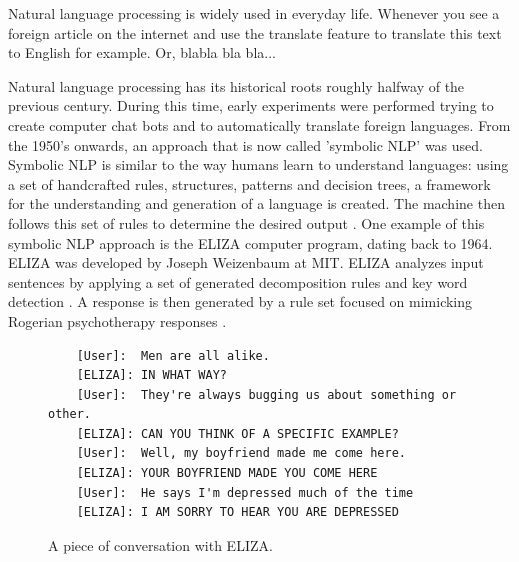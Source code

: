 \documentclass[twoside]{uva-inf-bachelor-thesis}
\begin{document}
Natural language processing is widely used in everyday life. Whenever you see a foreign article on the internet and use the translate feature to translate this text to English for example. Or, blabla bla bla...

Natural language processing has its historical roots roughly halfway of the previous century. During this time, early experiments were performed trying to create computer chat bots and to automatically translate foreign languages. From the 1950's onwards, an approach that is now called 'symbolic NLP' was used. Symbolic NLP is similar to the way humans learn to understand languages: using a set of handcrafted rules, structures, patterns and decision trees, a framework for the understanding and generation of a language is created. The machine then follows this set of rules to determine the desired output \cite{Dale00}. One example of this symbolic NLP approach is the ELIZA computer program, dating back to 1964. ELIZA was developed by Joseph Weizenbaum at MIT. ELIZA analyzes input sentences by applying a set of generated decomposition rules and key word detection \cite{weizenbaum66} \cite{Jurafsky08}. A response is then generated by a rule set focused on mimicking Rogerian psychotherapy responses \cite{Yao23}. 


\begin{figure}[h]
    \begin{verbatim}
    [User]:  Men are all alike.
    [ELIZA]: IN WHAT WAY?
    [User]:  They're always bugging us about something or other. 
    [ELIZA]: CAN YOU THINK OF A SPECIFIC EXAMPLE?
    [User]:  Well, my boyfriend made me come here.
    [ELIZA]: YOUR BOYFRIEND MADE YOU COME HERE
    [User]:  He says I'm depressed much of the time
    [ELIZA]: I AM SORRY TO HEAR YOU ARE DEPRESSED
    \end{verbatim}
    \caption{A piece of conversation with ELIZA. \cite{weizenbaum66}}
    \label{fig:eliza-conv}
\end{figure}
\end{document}
